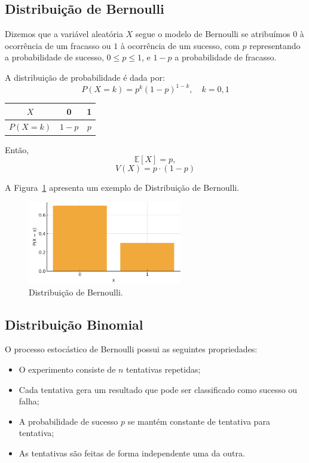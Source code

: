 \documentclass{article}
\begin{document}
\subsection{Distribuição de Bernoulli}
Dizemos que a variável aleatória $X$ segue o modelo de Bernoulli se atribuímos $0$ à ocorrência de um fracasso ou $1$ à ocorrência de um sucesso, com $p$ representando a probabilidade de sucesso,  
$0 \leq p \leq 1$, e $1 - p$ a probabilidade de fracasso.

A distribuição de probabilidade é dada por:
    $$
    P(X = k) = p^k (1 - p)^{1 - k}, \quad k = 0, 1
    $$

    \begin{center}
    \begin{tabular}{c|cc}
    $X$ & 0 & 1 \\
    \hline
    $P(X = k)$ & $1 - p$ & $p$
    \end{tabular}
    \end{center}

Então,
    $$
    \mathbb{E}[X] = p,
    $$
    $$
    V(X) = p \cdot (1-p)
    $$

A Figura~\ref{fig:dist_disc_bernoulli} apresenta um exemplo de Distribuição de Bernoulli.

\begin{figure}[H]
    \centering
    \includegraphics[width=0.6\textwidth]{figuras/dist_disc_bernoulli.png}
    \caption{Distribuição de Bernoulli.}
    \label{fig:dist_disc_bernoulli}
\end{figure}

\subsection{Distribuição Binomial}
O processo estocástico de Bernoulli possui as seguintes propriedades:
\begin{itemize}
    \item O experimento consiste de $n$ tentativas repetidas;
    \item Cada tentativa gera um resultado que pode ser classificado como sucesso ou falha;
    \item A probabilidade de sucesso $p$ se mantém constante de tentativa para tentativa;
    \item As tentativas são feitas de forma independente uma da outra.
\end{itemize}
\end{document}
